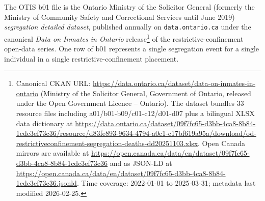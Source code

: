 \documentclass[article,shortnames,nojss]{jss}
\newcommand{\OTIS}{\textsf{OTIS}}
\begin{document}
The \OTIS{} b01 file is the Ontario Ministry of the Solicitor
General (formerly the Ministry of Community Safety and
Correctional Services until June 2019) \emph{segregation
detailed dataset}, published annually on \texttt{data.ontario.ca}
under the canonical \emph{Data on Inmates in Ontario}
release\footnote{Canonical CKAN URL:
\url{https://data.ontario.ca/dataset/data-on-inmates-in-ontario}
(Ministry of the Solicitor General, Government of Ontario,
released under the Open Government Licence -- Ontario).  The
dataset bundles 33 resource files including
a01/b01-b09/c01-c12/d01-d07 plus a bilingual XLSX data
dictionary at
\url{https://data.ontario.ca/dataset/09f7fc65-d3bb-4ca8-8b84-1cdc3ef73c36/resource/d83fe893-9634-4794-a0c1-c17bf619a95a/download/od-restrictiveconfinement-segregation-deaths-dd20251103.xlsx}.
Open Canada mirrors are available at
\url{https://open.canada.ca/data/en/dataset/09f7fc65-d3bb-4ca8-8b84-1cdc3ef73c36}
and as JSON-LD at
\url{https://open.canada.ca/data/en/dataset/09f7fc65-d3bb-4ca8-8b84-1cdc3ef73c36.jsonld}.
Time coverage: 2022-01-01 to 2025-03-31; metadata last modified
2026-02-25.} of the restrictive-confinement open-data series.
One row of b01 represents a single segregation event for a
single individual in a single restrictive-confinement placement.
\end{document}
